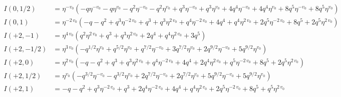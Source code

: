\documentclass[11pt,a4paper]{article}
\begin{document}
\begin{align*}
I(0, 1/2) &= \eta^{-v_{0}} \left( -q \eta^{-v_{0}} - q \eta^{v_{0}} - q^{2} \eta^{-v_{0}} - q^{2} \eta^{v_{0}} + q^{3} \eta^{-v_{0}} + q^{3} \eta^{v_{0}} + 4 q^{4} \eta^{-v_{0}} + 4 q^{4} \eta^{v_{0}} + 8 q^{5} \eta^{-v_{0}} + 8 q^{5} \eta^{v_{0}} \right) \\
I(0, 1) &= \eta^{-2 \, v_{0}} \left( -q - q^{2} + q^{3} \eta^{-2 \, v_{0}} + q^{3} + q^{3} \eta^{2 \, v_{0}} + q^{4} \eta^{-2 \, v_{0}} + 4 q^{4} + q^{4} \eta^{2 \, v_{0}} + 2 q^{5} \eta^{-2 \, v_{0}} + 8 q^{5} + 2 q^{5} \eta^{2 \, v_{0}} \right) \\
I(+2, -1) &= \eta^{4 \, v_{0}} \left( q^{2} \eta^{2 \, v_{0}} + q^{3} + q^{3} \eta^{2 \, v_{0}} + 2 q^{4} + q^{4} \eta^{2 \, v_{0}} + 3 q^{5} \right) \\
I(+2, -1/2) &= \eta^{3 \, v_{0}} \left( -q^{1/2} \eta^{v_{0}} + q^{5/2} \eta^{v_{0}} + q^{7/2} \eta^{-v_{0}} + 3 q^{7/2} \eta^{v_{0}} + 2 q^{9/2} \eta^{-v_{0}} + 5 q^{9/2} \eta^{v_{0}} \right) \\
I(+2, 0) &= \eta^{2 \, v_{0}} \left( -q - q^{2} + q^{3} + q^{3} \eta^{2 \, v_{0}} + q^{4} \eta^{-2 \, v_{0}} + 4 q^{4} + 2 q^{4} \eta^{2 \, v_{0}} + q^{5} \eta^{-2 \, v_{0}} + 8 q^{5} + 2 q^{5} \eta^{2 \, v_{0}} \right) \\
I(+2, 1/2) &= \eta^{v_{0}} \left( -q^{3/2} \eta^{-v_{0}} - q^{3/2} \eta^{v_{0}} + 2 q^{7/2} \eta^{-v_{0}} + 2 q^{7/2} \eta^{v_{0}} + 5 q^{9/2} \eta^{-v_{0}} + 5 q^{9/2} \eta^{v_{0}} \right) \\
I(+2, 1) &= -q - q^{2} + q^{3} \eta^{-2 \, v_{0}} + q^{3} + 2 q^{4} \eta^{-2 \, v_{0}} + 4 q^{4} + q^{4} \eta^{2 \, v_{0}} + 2 q^{5} \eta^{-2 \, v_{0}} + 8 q^{5} + q^{5} \eta^{2 \, v_{0}} \\
\end{align*}
\end{document}

